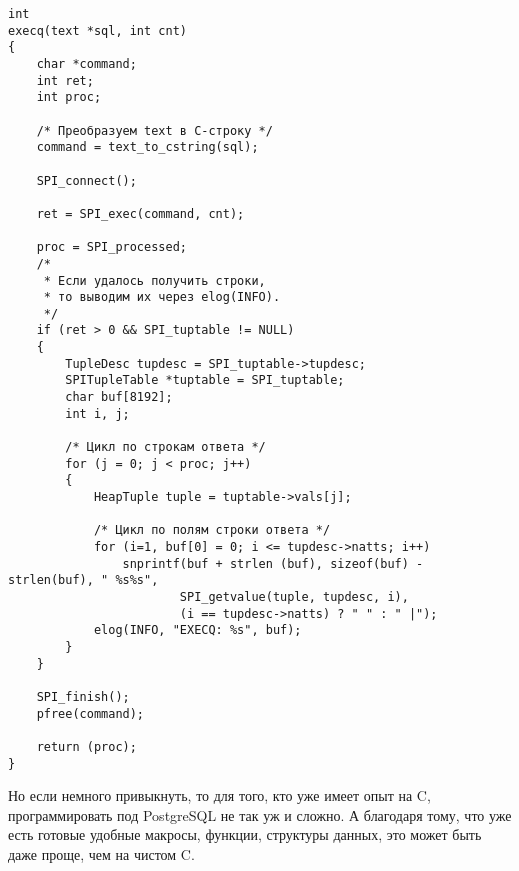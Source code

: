 \documentclass[10pt, a5paper]{article}
\begin{document}
\begin{verbatim}
int
execq(text *sql, int cnt)
{
    char *command;
    int ret;
    int proc;

    /* Преобразуем text в C-строку */
    command = text_to_cstring(sql);

    SPI_connect();

    ret = SPI_exec(command, cnt);

    proc = SPI_processed;
    /*
     * Если удалось получить строки, 
     * то выводим их через elog(INFO).
     */
    if (ret > 0 && SPI_tuptable != NULL)
    {
        TupleDesc tupdesc = SPI_tuptable->tupdesc;
        SPITupleTable *tuptable = SPI_tuptable;
        char buf[8192];
        int i, j;

        /* Цикл по строкам ответа */
        for (j = 0; j < proc; j++)
        {
            HeapTuple tuple = tuptable->vals[j];

            /* Цикл по полям строки ответа */
            for (i=1, buf[0] = 0; i <= tupdesc->natts; i++)
                snprintf(buf + strlen (buf), sizeof(buf) - 
strlen(buf), " %s%s",
                        SPI_getvalue(tuple, tupdesc, i),
                        (i == tupdesc->natts) ? " " : " |");
            elog(INFO, "EXECQ: %s", buf);
        }
    }

    SPI_finish();
    pfree(command);

    return (proc);
}\end{verbatim}
Но если немного привыкнуть, то для того, кто уже имеет опыт на C, программировать под PostgreSQL не так уж и сложно. А благодаря тому, что уже есть готовые удобные макросы, функции, структуры данных, это может быть даже проще, чем на чистом C.
\end{document}
